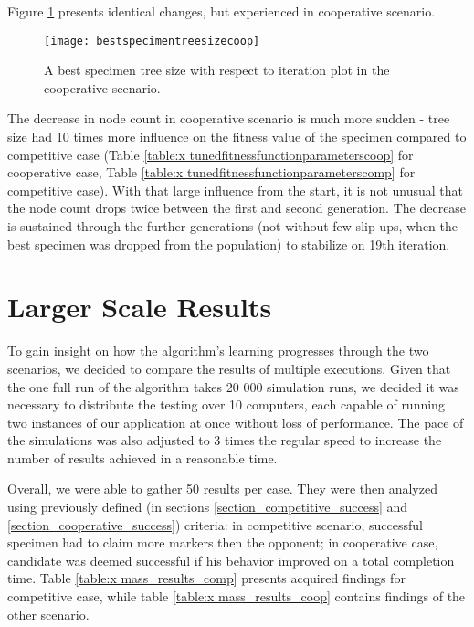 Figure \ref{fig:x cooperativebestspecimentreesizeplot} presents identical changes, but experienced in cooperative scenario.
\begin{figure}[H]
    \centering
    \texttt{[image: bestspecimentreesizecoop]}
    \caption{A best specimen tree size with respect to iteration plot in the cooperative scenario.}
    \label{fig:x cooperativebestspecimentreesizeplot}
\end{figure}
The decrease in node count in cooperative scenario is much more sudden - tree size had 10 times more influence on the fitness value of the specimen compared to competitive case (Table \ref{table:x tunedfitnessfunctionparameterscoop} for cooperative case, Table \ref{table:x tunedfitnessfunctionparameterscomp} for competitive case). With that large influence from the start, it is not unusual that the node count drops twice between the first and second generation. The decrease is sustained through the further generations (not without few slip-ups, when the best specimen was dropped from the population) to stabilize on 19th iteration.
\section{ Larger Scale Results } %
To gain insight on how the algorithm's learning progresses through the two scenarios, we decided to compare the results of multiple executions. Given that the one full run of the algorithm takes 20 000 simulation runs, we decided it was necessary to distribute the testing over 10 computers, each capable of running two instances of our application at once without loss of performance. The pace of the simulations was also adjusted to 3 times the regular speed to increase the number of results achieved in a reasonable time.

Overall, we were able to gather 50 results per case. They were then analyzed using previously defined (in sections \ref{section_competitive_success} and \ref{section_cooperative_success}) criteria: in competitive scenario, successful specimen had to claim more markers then the opponent; in cooperative case, candidate was deemed successful if his behavior improved on a total completion time. Table \ref{table:x mass_results_comp} presents acquired findings for competitive case, while table \ref{table:x mass_results_coop} contains findings of the other scenario.

